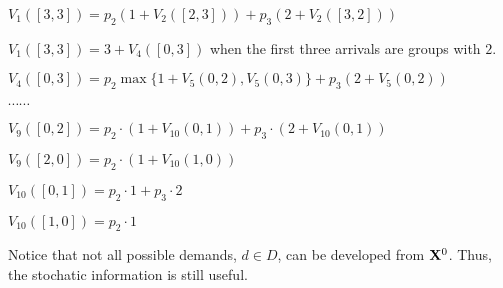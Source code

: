 $V_{1}([3,3]) = p_{2} (1+ V_{2}([2,3])) + p_{3} (2 + V_{2}([3,2]))$

$V_{1}([3,3]) = 3 + V_{4}([0,3])$ when the first three arrivals are groups with $2$.

$V_{4}([0,3]) = p_{2} \max\{1 + V_{5}(0,2), V_{5}(0,3)\} + p_{3} (2+ V_{5}(0,2))$

$\cdots \cdots$

$V_{9}([0,2]) = p_{2} \cdot (1 + V_{10}(0,1)) + p_{3} \cdot (2+ V_{10}(0,1))$

$V_{9}([2,0]) = p_{2} \cdot (1 + V_{10}(1,0))$

$V_{10}([0,1]) = p_{2} \cdot 1 + p_{3} \cdot 2$

$V_{10}([1,0]) = p_{2} \cdot 1$

Notice that not all possible demands, $d \in D$, can be developed from $\mathbf{X}^{0}$. Thus, the stochatic information is still useful.